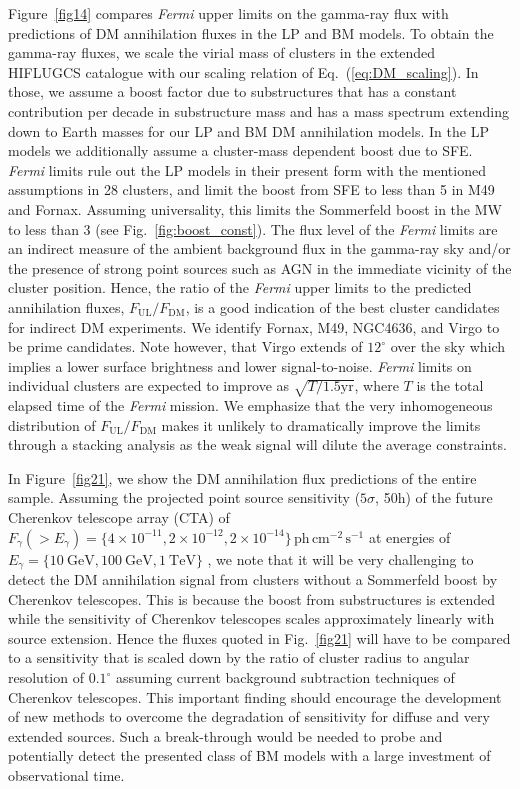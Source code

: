 \documentclass[10pt,aps,pra,reprint,amsmath,amsfonts,amssymb,showpacs,nofootinbib,floatfix]{revtex4-1}
\newcommand{\Fermi}{{\em Fermi}\xspace}
\newcommand{\rmn}{\mathrm}
\begin{document}
Figure~\ref{fig14} compares \Fermi upper limits on the gamma-ray flux
with predictions of DM annihilation fluxes in the LP and BM models.
To obtain the gamma-ray fluxes, we scale the virial mass of clusters
in the extended HIFLUGCS catalogue \cite{2007A&A...466..805C} with our
scaling relation of Eq.~(\ref{eq:DM_scaling}). In those, we assume a
boost factor due to substructures that has a constant contribution per
decade in substructure mass and has a mass spectrum extending down to
Earth masses for our LP and BM DM annihilation models. In the LP
models we additionally assume a cluster-mass dependent boost due to
SFE. \Fermi limits rule out the LP models in their present form with
the mentioned assumptions in 28 clusters, and limit the boost from SFE
to less than 5 in M49 and Fornax. Assuming universality, this limits
the Sommerfeld boost in the MW to less than 3 (see
Fig.~\ref{fig:boost_const}).  The flux level of the \Fermi limits are
an indirect measure of the ambient background flux in the gamma-ray
sky and/or the presence of strong point sources such as AGN in the
immediate vicinity of the cluster position. Hence, the ratio of the
\Fermi upper limits to the predicted annihilation fluxes,
$F_{\mathrm{UL}}/F_{\mathrm{DM}}$, is a good indication of the best
cluster candidates for indirect DM experiments. We identify Fornax,
M49, NGC4636, and Virgo to be prime candidates. Note however, that
Virgo extends of $12^\circ$ over the sky which implies a lower surface
brightness and lower signal-to-noise.  \Fermi limits on individual
clusters are expected to improve as $\sqrt{T/1.5 \mathrm{yr}}$, where
$T$ is the total elapsed time of the \Fermi mission. We emphasize that
the very inhomogeneous distribution of $F_{\mathrm{UL}}/
F_{\mathrm{DM}}$ makes it unlikely to dramatically improve the limits
through a stacking analysis as the weak signal will dilute the average
constraints.

In Figure~\ref{fig21}, we show the DM annihilation flux predictions of
the entire sample.  Assuming the projected point source sensitivity
($5\sigma$, 50h) of the future Cherenkov telescope array (CTA) of
$F_\gamma(>E_\gamma) = \{4\times10^{-11}, 2\times10^{-12},
2\times10^{-14}\}\,\rmn{ph}\,\rmn{cm}^{-2}\,\rmn{s}^{-1}$ at energies
of $E_\gamma=\{10~\rmn{GeV}, 100~\rmn{GeV}, 1~\rmn{TeV}\}$
\cite{Doro:2009qs}, we note that it will be very challenging to detect
the DM annihilation signal from clusters without a Sommerfeld boost by
Cherenkov telescopes.  This is because the boost from substructures is
extended while the sensitivity of Cherenkov telescopes scales
approximately linearly with source extension. Hence the fluxes
quoted in Fig.~\ref{fig21} will have to be compared to a sensitivity
that is scaled down by the ratio of cluster radius to angular
resolution of $0.1^\circ$ assuming current background subtraction
techniques of Cherenkov telescopes. This important finding should
encourage the development of new methods to overcome the degradation
of sensitivity for diffuse and very extended sources. Such a
break-through would be needed to probe and potentially detect the
presented class of BM models with a large investment of observational
time.
\end{document}
